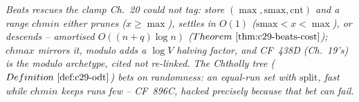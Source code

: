 \begin{recallbox}
\emph{Beats rescues the clamp Ch.~20 could not tag: store
\((\max,\mathrm{smax},\mathrm{cnt})\) and a range \(\mathit{chmin}\) either prunes
(\(x\ge\max\)), settles in \(O(1)\) (\(\mathrm{smax}<x<\max\)), or descends --
amortised \(O((n+q)\log n)\) (\(\thmref{c29-beats-cost}\)); \(\mathit{chmax}\)
mirrors it, modulo adds a \(\log V\) halving factor, and CF~438D (Ch.~19's) is the
modulo archetype, cited not re-linked.  The Chtholly tree (\(\defref{c29-odt}\))
bets on randomness: an equal-run set with \(\mathrm{split}\), fast while
\(\mathit{chmin}\) keeps runs few -- CF~896C, hacked precisely because that bet can
fail.}
\end{recallbox}
